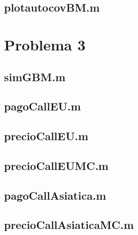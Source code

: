 \documentclass[a4paper,11pt]{article}
\begin{document}
    \subsection{plotautocovBM.m}
    

  \pagebreak

  \section{Problema 3}
    \subsection{simGBM.m}
    
    \pagebreak
    \subsection{pagoCallEU.m}
    
    \subsection{precioCallEU.m}
    
     \subsection{precioCallEUMC.m}
     
     \subsection{pagoCallAsiatica.m}
     
     \subsection{precioCallAsiaticaMC.m}
     
\end{document}
